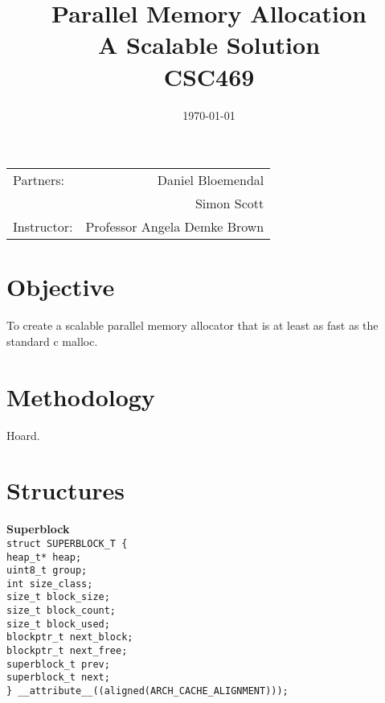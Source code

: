 \documentclass[11pt]{article}
\title{Parallel Memory Allocation \\ A Scalable Solution \\ CSC469} %
\date{\today} %
\begin{document}
\maketitle %

\begin{center}
\begin{tabular}{l r}
Partners: & Daniel Bloemendal \\ %
& Simon Scott \\
Instructor: & Professor Angela Demke Brown %
\end{tabular}
\end{center}



\section{Objective}

To create a scalable parallel memory allocator that is at least as fast as the standard c malloc.


\section{Methodology}
	Hoard.
\section{Structures}

\textbf{Superblock}
\texttt{
\\
struct SUPERBLOCK\_T \{
\\
    heap\_t* heap;
\\
    uint8\_t group;
\\
    int size\_class;
\\
    size\_t block\_size;
\\
    size\_t block\_count;
\\
    size\_t block\_used;
\\
    blockptr\_t next\_block;
\\
    blockptr\_t next\_free;
\\
    superblock\_t\* prev;
\\
    superblock\_t\* next;
\\
\} \_\_attribute\_\_((aligned(ARCH\_CACHE\_ALIGNMENT)));
}
\\
\\
\end{document}
